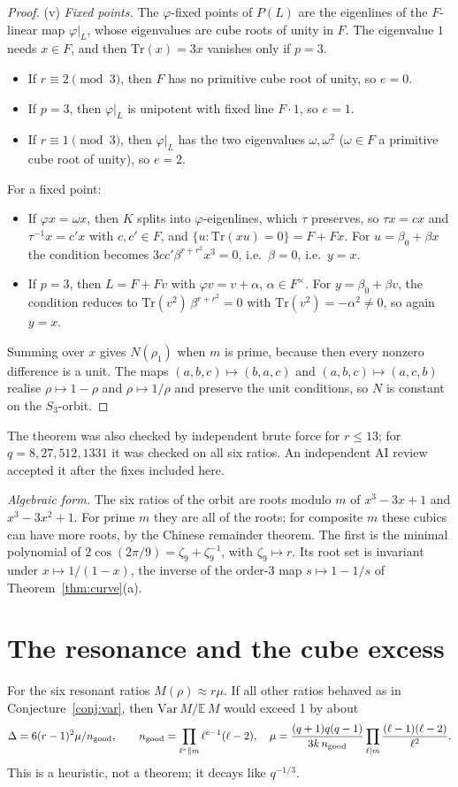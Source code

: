\documentclass[11pt]{article}
\begin{document}
\begin{proof}
(v) \emph{Fixed points.} The $\varphi$-fixed points of $P(L)$ are the eigenlines of the $F$-linear map $\varphi|_L$, whose eigenvalues are cube roots of unity in $F$.
The eigenvalue $1$ needs $x\in F$, and then $\mathrm{Tr}(x)=3x$ vanishes only if $p=3$.
\begin{itemize}
\item If $r\equiv2\pmod3$, then $F$ has no primitive cube root of unity, so $e=0$.
\item If $p=3$, then $\varphi|_L$ is unipotent with fixed line $F\cdot1$, so $e=1$.
\item If $r\equiv1\pmod3$, then $\varphi|_L$ has the two eigenvalues $\omega,\omega^2$ ($\omega\in F$ a primitive cube root of unity), so $e=2$.
\end{itemize}
For a fixed point:
\begin{itemize}
\item If $\varphi x=\omega x$, then $K$ splits into $\varphi$-eigenlines, which $\tau$ preserves, so $\tau x=cx$ and $\tau^{-1}x=c'x$ with $c,c'\in F$, and $\{u:\mathrm{Tr}(xu)=0\}=F+Fx$.
For $u=\beta_0+\beta x$ the condition becomes $3cc'\beta^{r+r^2}x^3=0$, i.e.\ $\beta=0$, i.e.\ $y=x$.
\item If $p=3$, then $L=F+Fv$ with $\varphi v=v+\alpha$, $\alpha\in F^\times$. For $y=\beta_0+\beta v$, the condition reduces to $\mathrm{Tr}(v^2)\,\beta^{r+r^2}=0$ with $\mathrm{Tr}(v^2)=-\alpha^2\ne0$, so again $y=x$.
\end{itemize}
Summing over $x$ gives $N(\rho_1)$ when $m$ is prime, because then every nonzero difference is a unit.
The maps $(a,b,c)\mapsto(b,a,c)$ and $(a,b,c)\mapsto(a,c,b)$ realise $\rho\mapsto1-\rho$ and $\rho\mapsto1/\rho$ and preserve the unit conditions, so $N$ is constant on the $S_3$-orbit.
\end{proof}
The theorem was also checked by independent brute force for $r\le13$; for $q=8,27,512,1331$ it was checked on all six ratios. An independent AI review accepted it after the fixes included here.

\emph{Algebraic form.} The six ratios of the orbit are roots modulo $m$ of $x^3-3x+1$ and $x^3-3x^2+1$. For prime $m$ they are all of the roots;
for composite $m$ these cubics can have more roots, by the Chinese remainder theorem. The first is the minimal polynomial of $2\cos(2\pi/9)=\zeta_9+\zeta_9^{-1}$, with $\zeta_9\mapsto r$.
Its root set is invariant under $x\mapsto1/(1-x)$, the inverse of the order-3 map $s\mapsto1-1/s$ of Theorem~\ref{thm:curve}(a).

\section{The resonance and the cube excess}\label{sec:resblind}
For the six resonant ratios $M(\rho)\approx r\mu$. If all other ratios behaved as in Conjecture~\ref{conj:var}, then $\mathrm{Var}\,M/\mathbb E\,M$ would exceed 1 by about
\[\Delta=6(r-1)^2\mu/n_{\rm good},\qquad n_{\rm good}=\prod_{\ell^e\|m}\ell^{e-1}(\ell-2),\quad \mu=\frac{(q+1)q(q-1)}{3k\,n_{\rm good}}\prod_{\ell\mid m}\frac{(\ell-1)(\ell-2)}{\ell^2}.\]
This is a heuristic, not a theorem; it decays like $q^{-1/3}$.
\end{document}
